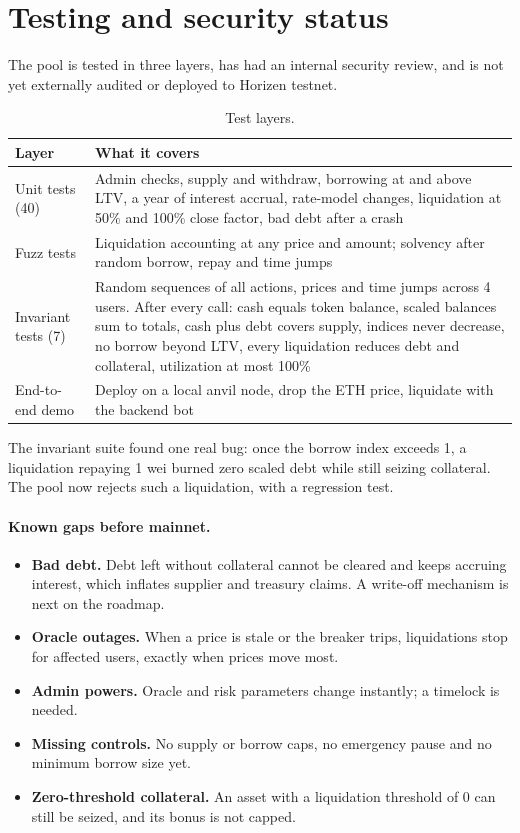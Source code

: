 \documentclass[11pt,a4paper]{article}
\begin{document}
\section{Testing and security status}

The pool is tested in three layers, has had an internal security review, and is not yet externally audited or
deployed to Horizen testnet.

\begin{table}[h]
\centering
\caption{Test layers.}
\begin{tabularx}{\textwidth}{@{}p{3.2cm}L@{}}
\toprule
Layer & What it covers \\
\midrule
Unit tests (40) & Admin checks, supply and withdraw, borrowing at and above LTV, a year of interest accrual,
  rate-model changes, liquidation at 50\% and 100\% close factor, bad debt after a crash \\
Fuzz tests & Liquidation accounting at any price and amount; solvency after random borrow, repay and time
  jumps \\
Invariant tests (7) & Random sequences of all actions, prices and time jumps across 4 users. After every call:
  cash equals token balance, scaled balances sum to totals, cash plus debt covers supply, indices never
  decrease, no borrow beyond LTV, every liquidation reduces debt and collateral, utilization at most 100\% \\
End-to-end demo & Deploy on a local anvil node, drop the ETH price, liquidate with the backend bot \\
\bottomrule
\end{tabularx}
\end{table}

The invariant suite found one real bug: once the borrow index exceeds 1, a liquidation repaying 1 wei burned
zero scaled debt while still seizing collateral. The pool now rejects such a liquidation, with a regression
test.

\paragraph{Known gaps before mainnet.}
\begin{itemize}
  \item \textbf{Bad debt.} Debt left without collateral cannot be cleared and keeps accruing interest, which
        inflates supplier and treasury claims. A write-off mechanism is next on the roadmap.
  \item \textbf{Oracle outages.} When a price is stale or the breaker trips, liquidations stop for affected
        users, exactly when prices move most.
  \item \textbf{Admin powers.} Oracle and risk parameters change instantly; a timelock is needed.
  \item \textbf{Missing controls.} No supply or borrow caps, no emergency pause and no minimum borrow size yet.
  \item \textbf{Zero-threshold collateral.} An asset with a liquidation threshold of 0 can still be seized, and
        its bonus is not capped.
\end{itemize}
\end{document}
